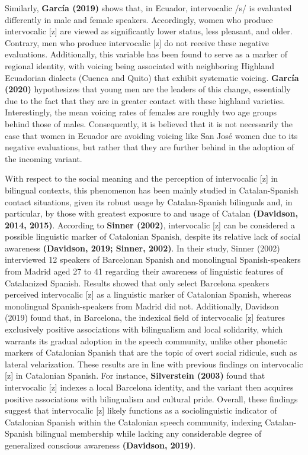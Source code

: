 \documentclass[
  a4paper,
  11pt,
  twocolumn]{article}
\begin{document}
Similarly, \textbf{García (2019)} shows that, in Ecuador, intervocalic
/s/ is evaluated differently in male and female speakers. Accordingly,
women who produce intervocalic {[}z{]} are viewed as significantly lower
status, less pleasant, and older. Contrary, men who produce intervocalic
{[}z{]} do not receive these negative evaluations. Additionally, this
variable has been found to serve as a marker of regional identity, with
voicing being associated with neighboring Highland Ecuadorian dialects
(Cuenca and Quito) that exhibit systematic voicing. \textbf{García
(2020)} hypothesizes that young men are the leaders of this change,
essentially due to the fact that they are in greater contact with these
highland varieties. Interestingly, the mean voicing rates of females are
roughly two age groups behind those of males. Consequently, it is
believed that it is not necessarily the case that women in Ecuador are
avoiding voicing like San José women due to its negative evaluations,
but rather that they are further behind in the adoption of the incoming
variant.

With respect to the social meaning and the perception of intervocalic
{[}z{]} in bilingual contexts, this phenomenon has been mainly studied
in Catalan-Spanish contact situations, given its robust usage by
Catalan-Spanish bilinguals and, in particular, by those with greatest
exposure to and usage of Catalan \textbf{(Davidson, 2014, 2015)}.
According to \textbf{Sinner (2002)}, intervocalic {[}z{]} can be
considered a possible linguistic marker of Catalonian Spanish, despite
its relative lack of social awareness \textbf{(Davidson, 2019; Sinner,
2002)}. In their study, Sinner (2002) interviewed 12 speakers of
Barcelonan Spanish and monolingual Spanish-speakers from Madrid aged 27
to 41 regarding their awareness of linguistic features of Catalanized
Spanish. Results showed that only select Barcelona speakers perceived
intervocalic {[}z{]} as a linguistic marker of Catalonian Spanish,
whereas monolingual Spanish-speakers from Madrid did not. Additionally,
Davidson (2019) found that, in Barcelona, the indexical field of
intervocalic {[}z{]} features exclusively positive associations with
bilingualism and local solidarity, which warrants its gradual adoption
in the speech community, unlike other phonetic markers of Catalonian
Spanish that are the topic of overt social ridicule, such as lateral
velarization. These results are in line with previous findings on
intervocalic {[}z{]} in Catalonian Spanish. For instance,
\textbf{Silverstein (2003)} found that intervocalic {[}z{]} indexes a
local Barcelona identity, and the variant then acquires positive
associations with bilingualism and cultural pride. Overall, these
findings suggest that intervocalic {[}z{]} likely functions as a
sociolinguistic indicator of Catalonian Spanish within the Catalonian
speech community, indexing Catalan-Spanish bilingual membership while
lacking any considerable degree of generalized conscious awareness
\textbf{(Davidson, 2019)}.
\end{document}
